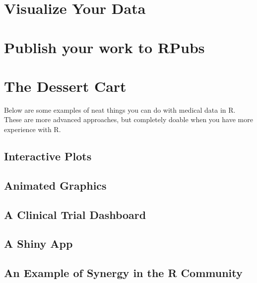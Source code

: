 \documentclass[
]{book}
\begin{document}
\hypertarget{visualize-your-data}{%
\section{Visualize Your Data}\label{visualize-your-data}}

\hypertarget{publish-your-work-to-rpubs}{%
\section{Publish your work to RPubs}\label{publish-your-work-to-rpubs}}

\hypertarget{the-dessert-cart}{%
\section{The Dessert Cart}\label{the-dessert-cart}}

Below are some examples of neat things you can do with medical data in R. These are more advanced approaches, but completely doable when you have more experience with R.

\hypertarget{interactive-plots}{%
\subsection{Interactive Plots}\label{interactive-plots}}

\hypertarget{animated-graphics}{%
\subsection{Animated Graphics}\label{animated-graphics}}

\hypertarget{a-clinical-trial-dashboard}{%
\subsection{A Clinical Trial Dashboard}\label{a-clinical-trial-dashboard}}

\hypertarget{a-shiny-app}{%
\subsection{A Shiny App}\label{a-shiny-app}}

\hypertarget{an-example-of-synergy-in-the-r-community}{%
\subsection{An Example of Synergy in the R Community}\label{an-example-of-synergy-in-the-r-community}}
\end{document}
